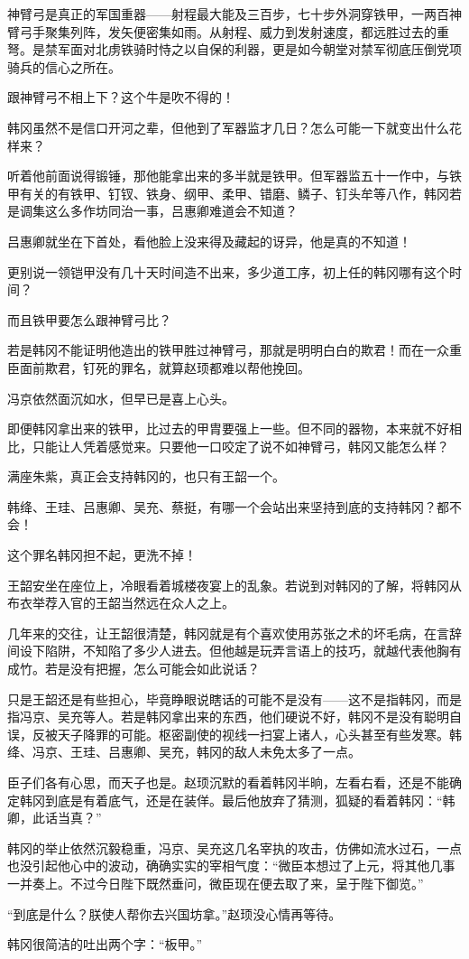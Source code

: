 神臂弓是真正的军国重器——射程最大能及三百步，七十步外洞穿铁甲，一两百神臂弓手聚集列阵，发矢便密集如雨。从射程、威力到发射速度，都远胜过去的重弩。是禁军面对北虏铁骑时恃之以自保的利器，更是如今朝堂对禁军彻底压倒党项骑兵的信心之所在。

跟神臂弓不相上下？这个牛是吹不得的！

韩冈虽然不是信口开河之辈，但他到了军器监才几日？怎么可能一下就变出什么花样来？

听着他前面说得锻锤，那他能拿出来的多半就是铁甲。但军器监五十一作中，与铁甲有关的有铁甲、钉钗、铁身、纲甲、柔甲、错磨、鳞子、钉头牟等八作，韩冈若是调集这么多作坊同治一事，吕惠卿难道会不知道？

吕惠卿就坐在下首处，看他脸上没来得及藏起的讶异，他是真的不知道！

更别说一领铠甲没有几十天时间造不出来，多少道工序，初上任的韩冈哪有这个时间？

而且铁甲要怎么跟神臂弓比？

若是韩冈不能证明他造出的铁甲胜过神臂弓，那就是明明白白的欺君！而在一众重臣面前欺君，钉死的罪名，就算赵顼都难以帮他挽回。

冯京依然面沉如水，但早已是喜上心头。

即便韩冈拿出来的铁甲，比过去的甲胄要强上一些。但不同的器物，本来就不好相比，只能让人凭着感觉来。只要他一口咬定了说不如神臂弓，韩冈又能怎么样？

满座朱紫，真正会支持韩冈的，也只有王韶一个。

韩绛、王珪、吕惠卿、吴充、蔡挺，有哪一个会站出来坚持到底的支持韩冈？都不会！

这个罪名韩冈担不起，更洗不掉！

王韶安坐在座位上，冷眼看着城楼夜宴上的乱象。若说到对韩冈的了解，将韩冈从布衣举荐入官的王韶当然远在众人之上。

几年来的交往，让王韶很清楚，韩冈就是有个喜欢使用苏张之术的坏毛病，在言辞间设下陷阱，不知陷了多少人进去。但他越是玩弄言语上的技巧，就越代表他胸有成竹。若是没有把握，怎么可能会如此说话？

只是王韶还是有些担心，毕竟睁眼说瞎话的可能不是没有——这不是指韩冈，而是指冯京、吴充等人。若是韩冈拿出来的东西，他们硬说不好，韩冈不是没有聪明自误，反被天子降罪的可能。枢密副使的视线一扫宴上诸人，心头甚至有些发寒。韩绛、冯京、王珪、吕惠卿、吴充，韩冈的敌人未免太多了一点。

臣子们各有心思，而天子也是。赵顼沉默的看着韩冈半晌，左看右看，还是不能确定韩冈到底是有着底气，还是在装佯。最后他放弃了猜测，狐疑的看着韩冈：“韩卿，此话当真？”

韩冈的举止依然沉毅稳重，冯京、吴充这几名宰执的攻击，仿佛如流水过石，一点也没引起他心中的波动，确确实实的宰相气度：“微臣本想过了上元，将其他几事一并奏上。不过今日陛下既然垂问，微臣现在便去取了来，呈于陛下御览。”

“到底是什么？朕使人帮你去兴国坊拿。”赵顼没心情再等待。

韩冈很简洁的吐出两个字：“板甲。”

